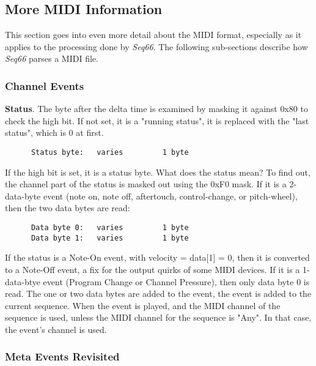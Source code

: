 \subsection{More MIDI Information}
\label{subsec:midi_information_more}

   This section goes into even more detail about the MIDI format, especially as
   it applies to the processing done by \textsl{Seq66}.
   The following sub-sections describe how \textsl{Seq66}
   parses a MIDI file.

\subsubsection{Channel Events}
\label{subsubsec:midi_format_channel_events}

   \textbf{Status}.
   The byte after the delta time is examined by masking it against 0x80 to check
   the high bit.  If not set, it is a "running status", it is replaced with the
   "last status", which is 0 at first.

   \begin{verbatim}
      Status byte:   varies         1 byte
   \end{verbatim}

   If the high bit is set, it is a status byte.  What does the status mean?  To
   find out, the channel part of the status is masked out using the 0xF0 mask.
   If it is a 2-data-byte event (note on, note off, aftertouch, control-change,
   or pitch-wheel), then the two data bytes are read:

   \begin{verbatim}
      Data byte 0:   varies         1 byte
      Data byte 1:   varies         1 byte
   \end{verbatim}

   If the status is a Note-On event, with velocity = data[1] = 0,
   then it is converted to a Note-Off event, a fix for the output quirks of
   some MIDI devices.
   If it is a 1-data-btye event (Program Change or Channel Pressure), then only
   data byte 0 is read.
   The one or two data bytes are added to the event,
   the event is added to the current sequence.
   When the event is played,
   and the MIDI channel of the sequence is used, unless
   the MIDI channel for the sequence is "Any".
   In that case, the event's channel is used.

\subsubsection{Meta Events Revisited}
\label{subsubsec:midi_format_meta_events_revisited}

